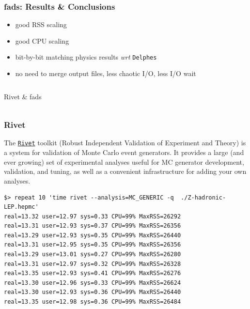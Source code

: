 \documentclass[9pt]{beamer}
\newcommand{\myblue} [1] {{\color{blue}#1}}
\begin{document}
\begin{frame}[fragile]
\frametitle{fads: Results \& Conclusions}


\begin{itemize}
\item good RSS scaling
\item good CPU scaling
\end{itemize}

\begin{itemize}
	\item bit-by-bit matching physics results \emph{wrt} \texttt{Delphes}
	\item no need to merge output files, less chaotic I/O, less I/O wait
\end{itemize}


\end{frame}

\begin{frame}[fragile]
	\begin{columns}
		\begin{column}{0.70\textwidth}
			\begin{block}{}
				\begin{center}
Rivet \& fads
				\end{center}
			\end{block}
		\end{column}
	\end{columns}



\end{frame}

\begin{frame}[fragile]
\frametitle{Rivet}


The \myblue{\href{http://rivet.hepforge.org/}{\texttt{Rivet}}} toolkit (Robust Independent Validation of Experiment and Theory) is a system for validation of Monte Carlo event generators. It provides a large (and ever growing) set of experimental analyses useful for MC generator development, validation, and tuning, as well as a convenient infrastructure for adding your own analyses.


	\begin{block}{}
\begin{verbatim}
$> repeat 10 'time rivet --analysis=MC_GENERIC -q  ./Z-hadronic-LEP.hepmc'
real=13.32 user=12.97 sys=0.33 CPU=99% MaxRSS=26292
real=13.31 user=12.93 sys=0.37 CPU=99% MaxRSS=26356
real=13.29 user=12.93 sys=0.35 CPU=99% MaxRSS=26440
real=13.31 user=12.95 sys=0.35 CPU=99% MaxRSS=26356
real=13.29 user=13.01 sys=0.27 CPU=99% MaxRSS=26280
real=13.31 user=12.97 sys=0.32 CPU=99% MaxRSS=26328
real=13.35 user=12.93 sys=0.41 CPU=99% MaxRSS=26276
real=13.30 user=12.96 sys=0.33 CPU=99% MaxRSS=26624
real=13.30 user=12.93 sys=0.36 CPU=99% MaxRSS=26440
real=13.35 user=12.98 sys=0.36 CPU=99% MaxRSS=26484
\end{verbatim}
	\end{block}{}



\end{frame}
\end{document}
